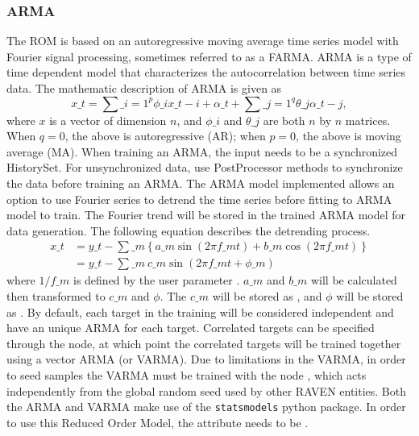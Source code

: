 \subsubsection{ARMA}
  The  ROM is based on an autoregressive moving average time series model with
  Fourier signal processing, sometimes referred to as a FARMA.                         ARMA is a
  type of time dependent model that characterizes the autocorrelation between time series data. The
  mathematic description of ARMA is given as                         \begin{equation*}
  x\_t = \sum\_{i=1}^p\phi\_ix\_{t-i}+\alpha\_t+\sum\_{j=1}^q\theta\_j\alpha\_{t-j},
  \end{equation*}                         where $x$ is a vector of dimension $n$, and $\phi\_i$ and
  $\theta\_j$ are both $n$ by $n$ matrices. When $q=0$, the above is
  autoregressive (AR); when $p=0$, the above is moving average (MA).                         When
  training an ARMA, the input needs to be a synchronized HistorySet. For unsynchronized data, use
  PostProcessor methods to                         synchronize the data before training an ARMA.
  The ARMA model implemented allows an option to use Fourier series to detrend the time series
  before fitting to ARMA model to                         train. The Fourier trend will be stored in
  the trained ARMA model for data generation. The following equation
  describes the detrending                         process.
  \begin{equation*}                         \begin{aligned}                         x\_t &= y\_t -
  \sum\_m\left\{a\_m\sin(2\pi f\_mt)+b\_m\cos(2\pi f\_mt)\right\}  \\                         &=y\_t -
  \sum\_m\ c\_m\sin(2\pi f\_mt+\phi\_m)                         \end{aligned}
  \end{equation*}                         where $1/f\_m$ is defined by the user parameter
  . \nb $a\_m$ and $b\_m$ will be calculated then transformed to
  $c\_m$ and $\phi$. The $c\_m$ will be stored as , and $\phi$ will be stored as
  .                         By default, each target in the training will be
  considered independent and have an unique ARMA for each                         target.
  Correlated targets can be specified through the  node, at which point
  the correlated targets will be trained together using a vector ARMA (or VARMA). Due to limitations
  in                         the VARMA, in order to seed samples the VARMA must be trained with the
  node , which acts                         independently from the global random seed
  used by other RAVEN entities.                         Both the ARMA and VARMA make use of the
  \texttt{statsmodels} python package.                         In order to use this Reduced Order
  Model, the  attribute                          needs to be
  .

